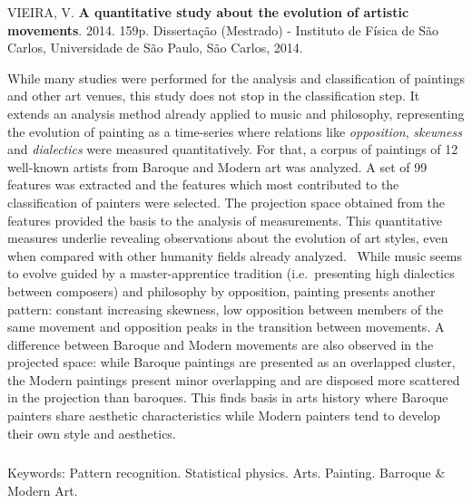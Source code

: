 \afterpage{\blankpage}

\begin{abstract2}
\vspace{-10mm}
VIEIRA, V. \textbf{A quantitative study about the evolution of artistic movements}. 2014. 159p. Dissertação (Mestrado) - Instituto de Física de São Carlos, Universidade de São Paulo, São Carlos, 2014.
\vspace{15mm}

  While many studies were performed for the analysis and
  classification of paintings and other art venues, this study does
  not stop in the classification step. It extends an analysis method
  already applied to music and philosophy, representing the evolution
  of painting as a time-series where relations like
  \textit{opposition}, \textit{skewness} and \textit{dialectics} were
  measured quantitatively. For that, a corpus of paintings of 12
  well-known artists from Baroque and Modern art was analyzed. A set
  of 99 features was extracted and the features which most contributed
  to the classification of painters were selected. The projection
  space obtained from the features provided the basis to the analysis
  of measurements. This quantitative measures underlie revealing
  observations about the evolution of art styles, even when compared
  with other humanity fields already analyzed.~\cite{vieira} While
  music seems to evolve guided by a master-apprentice tradition
  (i.e.\ presenting high dialectics between composers) and philosophy
  by opposition, painting presents another pattern: constant
  increasing skewness, low opposition between members of the same
  movement and opposition peaks in the transition between movements. A
  difference between Baroque and Modern movements are also observed in
  the projected space: while Baroque paintings are presented as an
  overlapped cluster, the Modern paintings present minor overlapping
  and are disposed more scattered in the projection than
  baroques. This finds basis in arts history where Baroque painters
  share aesthetic characteristics while Modern painters tend to
  develop their own style and aesthetics.

$\phantom{linha em branco}$\\
Keywords: Pattern recognition. Statistical physics. Arts. Painting. Barroque \& Modern Art.

\end{abstract2}
